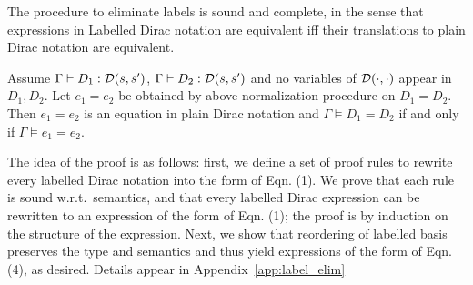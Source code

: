 The procedure to eliminate labels is sound and complete, in the sense
that expressions in Labelled Dirac notation are equivalent iff their
translations to plain Dirac notation are equivalent.
\begin{theorem}
  \label{thm: normalization}
  Assume $\Gamma\vdash D_1 : {\mathcal{D}}(s,s')$, $\Gamma\vdash D_2 :
  {\mathcal{D}}(s,s')$ and no variables of $\mathcal{D}(\cdot,\cdot)$ appear in
  $D_1,D_2$.  Let $e_1 = e_2$ be obtained by above normalization
  procedure on $D_1 = D_2$.  Then $e_1=e_2$ is an equation in plain
  Dirac notation and $\Gamma\vDash D_1 = D_2$ if and only if
  $\Gamma\vDash e_1 = e_2$.
\end{theorem}
The idea of the proof is as follows: first, we define a set of proof
rules to rewrite every labelled Dirac notation into the form of
Eqn. (1). We prove that each rule is sound w.r.t.\, semantics, and
that every labelled Dirac expression can be rewritten to an expression
of the form of Eqn. (1); the proof is by induction on the structure of
the expression. Next, we show that reordering of labelled basis
preserves the type and semantics and thus yield expressions of the
form of Eqn. (4), as desired. Details appear in
Appendix~\ref{app:label_elim}
  




